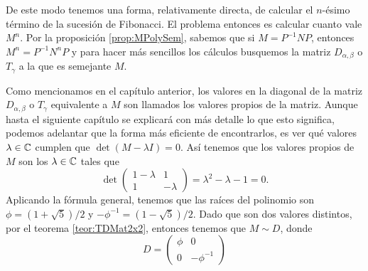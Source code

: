 De este modo tenemos una forma, relativamente directa, de calcular el $n$-ésimo término de la sucesión de Fibonacci. El problema entonces es calcular cuanto vale $M^n$. Por la proposición \ref{prop:MPolySem}, sabemos que si $M = P^{-1}NP$, entonces $M^n = P^{-1} N^n P$ y para hacer más sencillos los cálculos busquemos la matriz $D_{\alpha,\beta}$ o $T_\gamma$ a la que es semejante $M$.

Como mencionamos en el capítulo anterior, los valores en la diagonal de la matriz $D_{\alpha,\beta}$ o $T_\gamma$ equivalente a $M$ son llamados los valores propios de la matriz. Aunque hasta el siguiente capítulo se explicará con más detalle lo que esto significa, podemos adelantar que la forma más eficiente de encontrarlos, es ver qué valores $\lambda \in \mathbb{C}$ cumplen que $\det(M-\lambda I) = 0$. Así tenemos que los valores propios de $M$ son los $\lambda \in \mathbb{C}$ tales que
\[
  \det\begin{pmatrix} 1-\lambda & 1 \\ 1 & -\lambda \end{pmatrix} = \lambda^2 - \lambda - 1 = 0.
\]
Aplicando la fórmula general, tenemos que las raíces del polinomio son $\phi = (1+\sqrt{5})/2$ y $-\phi^{-1} = (1-\sqrt{5})/2$. Dado que son dos valores distintos, por el teorema \ref{teor:TDMat2x2}, entonces tenemos que $M \sim D$, donde
\[
  D = \begin{pmatrix}
    \phi & 0 \\
    0 & -\phi^{-1}
  \end{pmatrix}
\]


